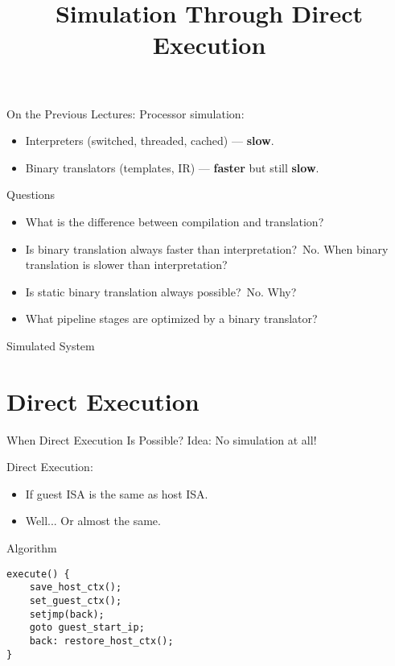 
\title{Simulation Through Direct Execution}



\startslides

\begin{frame}{On the Previous Lectures:}
Processor simulation:
\begin{itemize}
\item Interpreters (switched, threaded, cached) --- \textbf{slow}.
\item Binary translators (templates, IR) --- \textbf{faster} but still
  \textbf{slow}.
\end{itemize}
\end{frame}

\begin{frame}{Questions}
\begin{itemize}
\item What is the difference between compilation and translation?\pause
\item Is binary translation always faster than interpretation?\pause~No.
  When binary translation is slower than interpretation?\pause
\item Is static binary translation always possible?\pause~No. Why?\pause
\item What pipeline stages are optimized by a binary translator?
\end{itemize}
\end{frame}

\begin{frame}{Simulated System}
\centering
\vfill
{}
\vfill
\end{frame}

\section{Direct Execution}

\begin{frame}{When Direct Execution Is Possible?}
Idea: No simulation at all!

\bigskip
Direct Execution:
\begin{itemize}
\item If guest ISA is the same as host ISA.
\item Well... Or almost the same.
\end{itemize}
\end{frame}

\begin{frame}[fragile]{Algorithm}
\begin{verbatim}
execute() {
    save_host_ctx();
    set_guest_ctx();
    setjmp(back);
    goto guest_start_ip;
    back: restore_host_ctx();
}
\end{verbatim}
\end{frame}

